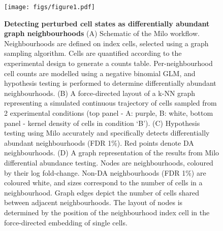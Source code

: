 \documentclass[
  10pt,
]{article}
\author{}
\date{\vspace{-2.5em}}
\begin{document}

\begin{figure}
\centering
\texttt{[image: figs/figure1.pdf]}
\caption{\label{fig:fig-1}\textbf{Detecting perturbed cell states as differentially abundant graph neighbourhoods}
(A) Schematic of the Milo workflow.
Neighbourhoods are defined on index cells, selected using a graph sampling algorithm.
Cells are quantified according to the experimental design to generate a counts table. Per-neighbourhood cell counts are modelled using a negative binomial GLM, and hypothesis testing is performed to determine differentially abundant neighbourhoods.
(B) A force-directed layout of a k-NN graph representing a simulated continuous trajectory of cells sampled from 2 experimental conditions (top panel - A: purple, B: white, bottom panel - kernel density of cells in condition `B').
(C) Hypothesis testing using Milo accurately and specifically detects differentially abundant neighbourhoods (FDR 1\%). Red points denote DA neighbourhoods.
(D)
A graph representation of the results from Milo differential abundance testing. Nodes are neighbourhoods, coloured by their log fold-change. Non-DA neighbourhoods (FDR 1\%) are coloured white, and sizes correspond to the number of cells in a neighbourhood. Graph edges depict the number of cells shared between adjacent neighbourhoods. The layout of nodes is determined by the position of the neighbourhood index cell in the force-directed embedding of single cells.}
\end{figure}
\end{document}
